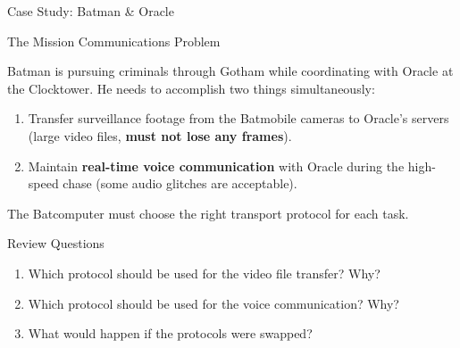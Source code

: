 \documentclass[aspectratio=169, 11pt]{beamer}
\newenvironment{casestudy}[1]{%
    \begin{alertblock}{#1}
}{\end{alertblock}}
\begin{document}
\begin{frame}{Case Study: Batman \& Oracle}
    \begin{casestudy}{The Mission Communications Problem}
        \small
        Batman is pursuing criminals through Gotham while coordinating with Oracle at the Clocktower. He needs to accomplish two things simultaneously:
        
        \vspace{0.3em}
        \begin{enumerate}\setlength{\itemsep}{2pt}
            \item Transfer surveillance footage from the Batmobile cameras to Oracle's servers (large video files, \textbf{must not lose any frames}).
            \item Maintain \textbf{real-time voice communication} with Oracle during the high-speed chase (some audio glitches are acceptable).
        \end{enumerate}
        
        \vspace{0.2em}
        The Batcomputer must choose the right transport protocol for each task.
    \end{casestudy}
    
    \begin{block}{Review Questions}
        \small
        \begin{enumerate}\setlength{\itemsep}{1pt}
            \item Which protocol should be used for the video file transfer? Why?
            \item Which protocol should be used for the voice communication? Why?
            \item What would happen if the protocols were swapped?
        \end{enumerate}
    \end{block}
\end{frame}
\end{document}
